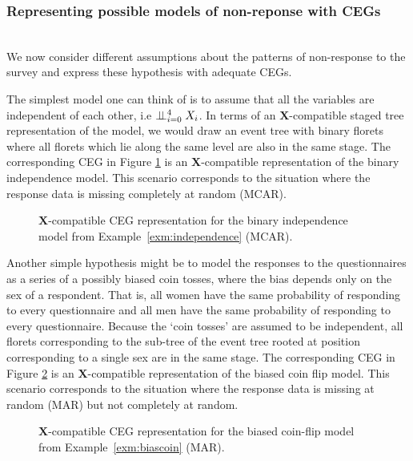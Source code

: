 \documentclass[runningheads]{llncs}
\newcommand{\ind}{\perp\mkern-9.5mu\perp}
\begin{document}
\subsubsection{Representing possible models of non-reponse with CEGs}\label{subsec:dropouts-hypothesis}
\hfill\\
We now consider different assumptions about the patterns of non-response to the survey and express these hypothesis with adequate CEGs. 
\begin{example}[Independence]
\label{exm:independence}
The simplest model one can think of is to assume that all the variables are independent of each other, i.e $\ind_{i=0}^{4}X_i$. In terms of an $\boldsymbol{X}$-compatible staged tree representation of the model, we would draw an event tree with binary florets where all florets which lie along the same level are also in the same stage. The corresponding CEG in Figure \ref{ceg:indep} is an $\boldsymbol{X}$-compatible representation of the binary independence model. This scenario corresponds to the situation where the response data is missing completely at random (MCAR).
\end{example}
\begin{figure}
\centering

\caption{$\boldsymbol{X}$-compatible CEG representation for the binary independence model from Example~\ref{exm:independence} (MCAR).}
\label{ceg:indep}
\end{figure}
\begin{example}
\label{exm:biascoin}
Another simple hypothesis might be to model the responses to the questionnaires as a series of a possibly biased coin tosses, where the bias depends only on the sex of a respondent. That is, all women have the same probability of responding to every questionnaire and all men have the same probability of responding to every questionnaire. Because the `coin tosses' are assumed to be independent, all florets corresponding to the sub-tree of the event tree rooted at position corresponding to a single sex are in the same stage. The corresponding CEG in Figure \ref{ceg:biascoin} is an $\boldsymbol{X}$-compatible representation of the biased coin flip model. This scenario corresponds to the situation where the response data is missing at random (MAR) but not completely at random.
\end{example}
\begin{figure}
\centering

\caption{$\boldsymbol{X}$-compatible CEG representation for the biased coin-flip model from Example~\ref{exm:biascoin} (MAR).}
\label{ceg:biascoin}
\end{figure}
\end{document}
